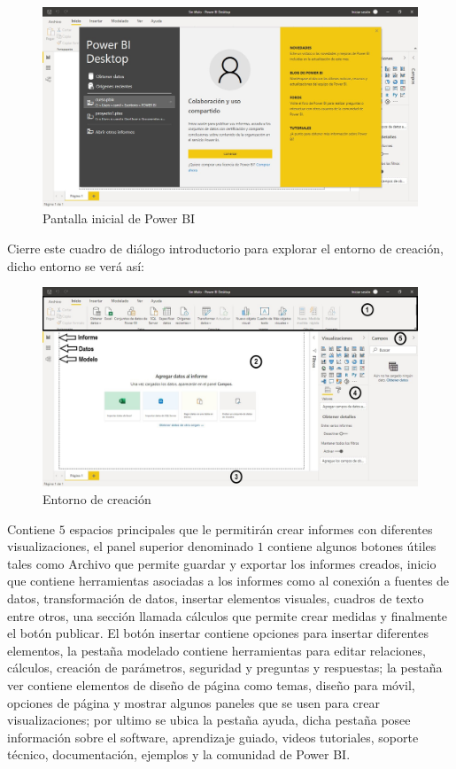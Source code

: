 \documentclass[
]{book}
\begin{document}
\begin{figure}

{\centering \includegraphics[width=0.8\linewidth]{Imágenes/powerbi5} 

}

\caption{Pantalla inicial de Power BI}\label{fig:pantallainicialpowerbi-fig}
\end{figure}

Cierre este cuadro de diálogo introductorio para explorar el entorno de creación, dicho entorno se verá así:

\begin{figure}

{\centering \includegraphics[width=0.8\linewidth]{Imágenes/powerbi6} 

}

\caption{Entorno de creación}\label{fig:entornocreacionpowerbi-fig}
\end{figure}

Contiene \(5\) espacios principales que le permitirán crear informes con diferentes visualizaciones, el panel superior denominado \(1\) contiene algunos botones útiles tales como Archivo que permite guardar y exportar los informes creados, inicio que contiene herramientas asociadas a los informes como al conexión a fuentes de datos, transformación de datos, insertar elementos visuales, cuadros de texto entre otros, una sección llamada cálculos que permite crear medidas y finalmente el botón publicar. El botón insertar contiene opciones para insertar diferentes elementos, la pestaña modelado contiene herramientas para editar relaciones, cálculos, creación de parámetros, seguridad y preguntas y respuestas; la pestaña ver contiene elementos de diseño de página como temas, diseño para móvil, opciones de página y mostrar algunos paneles que se usen para crear visualizaciones; por ultimo se ubica la pestaña ayuda, dicha pestaña posee información sobre el software, aprendizaje guiado, videos tutoriales, soporte técnico, documentación, ejemplos y la comunidad de Power BI.
\end{document}
